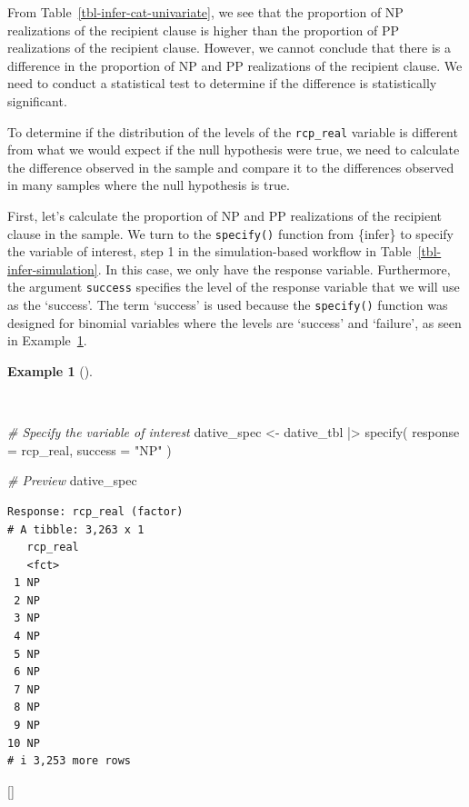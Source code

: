 \documentclass[
  letterpaper,
  krantz1]{latex/krantz-mod}
\newenvironment{Shaded}{\begin{snugshade}}{\end{snugshade}}
\newcommand{\AttributeTok}[1]{\textcolor[rgb]{0.00,0.00,0.00}{#1}}
\newcommand{\CommentTok}[1]{\textcolor[rgb]{0.00,0.00,0.00}{\textit{#1}}}
\newcommand{\FunctionTok}[1]{\textcolor[rgb]{0.00,0.00,0.00}{#1}}
\newcommand{\NormalTok}[1]{\textcolor[rgb]{0.00,0.00,0.00}{#1}}
\newcommand{\OtherTok}[1]{\textcolor[rgb]{0.00,0.00,0.00}{#1}}
\newcommand{\SpecialCharTok}[1]{\textcolor[rgb]{0.00,0.00,0.00}{#1}}
\newcommand{\StringTok}[1]{\textcolor[rgb]{0.00,0.00,0.00}{#1}}
\newcommand{\cindex}[1]{%
  \StrSubstitute{#1}{_}{\_}[\temp]%
  \index{\temp}%
}
\theoremstyle{definition}
\theoremstyle{definition}
\newtheorem{example}{Example}[chapter]
\theoremstyle{remark}
\begin{document}
From Table~\ref{tbl-infer-cat-univariate}, we see that the proportion of
NP realizations of the recipient clause is higher than the proportion of
PP realizations of the recipient clause. However, we cannot conclude
that there is a difference in the proportion of NP and PP realizations
of the recipient clause. We need to conduct a
statistical test to determine if the difference is statistically
significant.

To determine if the distribution of the levels of the \texttt{rcp\_real}
variable is different from what we would expect if the null hypothesis
were true, we need to calculate the difference observed in the sample
and compare it to the differences observed in many samples where the
null hypothesis is true.

First, let's calculate the proportion of NP and PP realizations of the
recipient clause in the sample. We turn to the \texttt{specify()}
function from \{infer\} to specify the variable of interest, step 1 in
the simulation-based workflow in Table~\ref{tbl-infer-simulation}. In
this case, we only have the response variable.
Furthermore, the argument \texttt{success} specifies the level of the
response variable that we will use as the `success'. The term `success'
is used because the \texttt{specify()} function was designed for
binomial variables where the levels are `success' and `failure', as seen
in Example~\ref{exm-infer-cat-specify}.

\begin{example}[]\protect\hypertarget{exm-infer-cat-specify}{}\label{exm-infer-cat-specify}

~

\begin{Shaded}
\begin{Highlighting}[numbers=left,,]
\CommentTok{\# Specify the variable of interest}
\NormalTok{dative\_spec }\OtherTok{\textless{}{-}}
\NormalTok{  dative\_tbl }\SpecialCharTok{|\textgreater{}}
  \FunctionTok{specify}\NormalTok{(}
    \AttributeTok{response =}\NormalTok{ rcp\_real,}
    \AttributeTok{success =} \StringTok{"NP"}
\NormalTok{  )}

\CommentTok{\# Preview}
\NormalTok{dative\_spec}
\end{Highlighting}
\end{Shaded}

\begin{verbatim}
Response: rcp_real (factor)
# A tibble: 3,263 x 1
   rcp_real
   <fct>   
 1 NP      
 2 NP      
 3 NP      
 4 NP      
 5 NP      
 6 NP      
 7 NP      
 8 NP      
 9 NP      
10 NP      
# i 3,253 more rows
\end{verbatim}

 \cindex{specify()}

\end{example}
\end{document}
